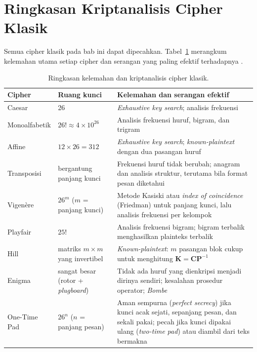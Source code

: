 ﻿\section{Ringkasan Kriptanalisis Cipher Klasik}

Semua cipher klasik pada bab ini dapat dipecahkan. Tabel~\ref{tab:ringkasan-kriptanalisis} merangkum kelemahan utama setiap cipher dan serangan yang paling efektif terhadapnya \cite{stallings2017,menezes1996,munir_slides_itb}.

\begin{table}[htbp]
  \centering
  \small
  \begin{tabular}{@{}p{2.7cm}p{3.6cm}p{6.6cm}@{}}
    \toprule
    Cipher & Ruang kunci & Kelemahan dan serangan efektif \\
    \midrule
    Caesar & 26 & \textit{Exhaustive key search}; analisis frekuensi \\
    Monoalfabetik & $26! \approx 4 \times 10^{26}$ & Analisis frekuensi huruf, bigram, dan trigram \\
    Affine & $12 \times 26 = 312$ & \textit{Exhaustive key search}; \textit{known-plaintext} dengan dua pasangan huruf \\
    Transposisi & bergantung panjang kunci & Frekuensi huruf tidak berubah; anagram dan analisis struktur, terutama bila format pesan diketahui \\
    Vigen\`{e}re & $26^m$ ($m$ = panjang kunci) & Metode Kasiski atau \textit{index of coincidence} (Friedman) untuk panjang kunci, lalu analisis frekuensi per kelompok \\
    Playfair & $25!$ & Analisis frekuensi bigram; bigram terbalik menghasilkan plainteks terbalik \\
    Hill & matriks $m \times m$ yang invertibel & \textit{Known-plaintext}: $m$ pasangan blok cukup untuk menghitung $\mathbf{K} = \mathbf{C}\mathbf{P}^{-1}$ \\
    Enigma & sangat besar (rotor + \textit{plugboard}) & Tidak ada huruf yang dienkripsi menjadi dirinya sendiri; kesalahan prosedur operator; \textit{Bombe} \\
    One-Time Pad & $26^n$ ($n$ = panjang pesan) & Aman sempurna (\textit{perfect secrecy}) jika kunci acak sejati, sepanjang pesan, dan sekali pakai; pecah jika kunci dipakai ulang (\textit{two-time pad}) atau diambil dari teks bermakna \\
    \bottomrule
  \end{tabular}
  \caption{Ringkasan kelemahan dan kriptanalisis cipher klasik.}
  \label{tab:ringkasan-kriptanalisis}
\end{table}

